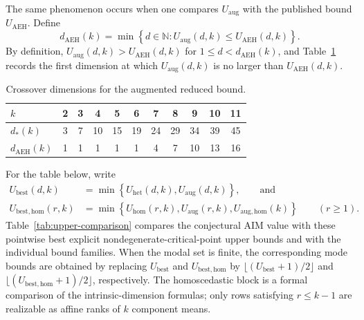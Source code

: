 \documentclass[11pt]{article}
\theoremstyle{plain}
\theoremstyle{definition}
\theoremstyle{remark}
\numberwithin{equation}{section}
\begin{document}
The same phenomenon occurs when one compares $U_{\mathrm{aug}}$ with the published bound $U_{\mathrm{AEH}}$. Define
\[
d_{\mathrm{AEH}}(k)=\min\left\{d\in\mathbb N: U_{\mathrm{aug}}(d,k)\le U_{\mathrm{AEH}}(d,k)\right\}.
\]
By definition, $U_{\mathrm{aug}}(d,k)>U_{\mathrm{AEH}}(d,k)$ for $1\le d<d_{\mathrm{AEH}}(k)$, and Table~\ref{tab:crossover} records the first dimension at which $U_{\mathrm{aug}}(d,k)$ is no larger than $U_{\mathrm{AEH}}(d,k)$.

\begin{table}[htbp]
\centering
\caption{Crossover dimensions for the augmented reduced bound.}
\label{tab:crossover}
\small
\begin{tabular}{lcccccccccc}
\toprule
$k$ & 2 & 3 & 4 & 5 & 6 & 7 & 8 & 9 & 10 & 11 \\
\midrule
$d_\ast(k)$ & 3 & 7 & 10 & 15 & 19 & 24 & 29 & 34 & 39 & 45 \\
$d_{\mathrm{AEH}}(k)$ & 1 & 1 & 1 & 1 & 1 & 4 & 7 & 10 & 13 & 16 \\
\bottomrule
\end{tabular}
\end{table}

For the table below, write
\[
\begin{aligned}
U_{\mathrm{best}}(d,k)
&=\min\left\{U_{\mathrm{het}}(d,k),U_{\mathrm{aug}}(d,k)\right\},\qquad\text{and}\\
U_{\mathrm{best,hom}}(r,k)
&=\min\left\{U_{\mathrm{hom}}(r,k),U_{\mathrm{aug}}(r,k),U_{\mathrm{aug,hom}}(k)\right\}\qquad (r\ge1).
\end{aligned}
\]
Table~\ref{tab:upper-comparison} compares the conjectural AIM value with these pointwise best explicit nondegenerate-critical-point upper bounds and with the individual bound families. When the modal set is finite, the corresponding mode bounds are obtained by replacing $U_{\mathrm{best}}$ and $U_{\mathrm{best,hom}}$ by $\lfloor(U_{\mathrm{best}}+1)/2\rfloor$ and $\lfloor(U_{\mathrm{best,hom}}+1)/2\rfloor$, respectively. The homoscedastic block is a formal comparison of the intrinsic-dimension formulas; only rows satisfying $r\le k-1$ are realizable as affine ranks of $k$ component means.
\end{document}
